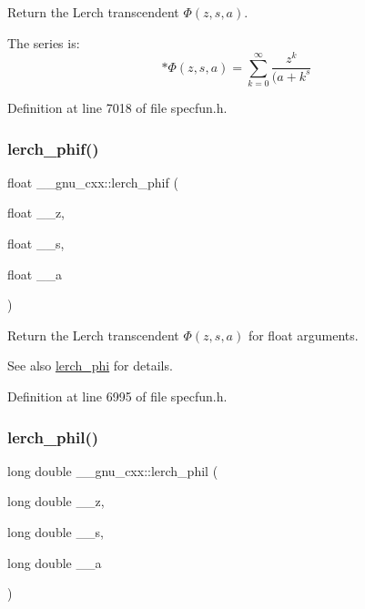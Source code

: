 Return the Lerch transcendent $ \Phi(z,s,a) $.

The series is\+: \[ * \Phi(z,s,a) = \sum_{k=0}^{\infty}\frac{z^k}{(a+k^s} \] 

Definition at line 7018 of file specfun.\+h.

\mbox{\label{group__gnu__math__spec__func_ga90ae3ca570b08b3f458aa83ec2759be3}} 
\subsubsection{\texorpdfstring{lerch\+\_\+phif()}{lerch\_phif()}}
{\footnotesize\ttfamily float \+\_\+\+\_\+gnu\+\_\+cxx\+::lerch\+\_\+phif (\begin{DoxyParamCaption}\item[{float}]{\+\_\+\+\_\+z,  }\item[{float}]{\+\_\+\+\_\+s,  }\item[{float}]{\+\_\+\+\_\+a }\end{DoxyParamCaption})\hspace{0.3cm}{\ttfamily [inline]}}

Return the Lerch transcendent $ \Phi(z,s,a) $ for {\ttfamily float} arguments.

\begin{DoxySeeAlso}{See also}
\hyperlink{group__gnu__math__spec__func_ga31d7cfc601a99d72e58f654d0c890fd6}{lerch\+\_\+phi} for details. 
\end{DoxySeeAlso}


Definition at line 6995 of file specfun.\+h.

\mbox{\label{group__gnu__math__spec__func_gab975fa919ede92ec176330809c16c8d5}} 
\subsubsection{\texorpdfstring{lerch\+\_\+phil()}{lerch\_phil()}}
{\footnotesize\ttfamily long double \+\_\+\+\_\+gnu\+\_\+cxx\+::lerch\+\_\+phil (\begin{DoxyParamCaption}\item[{long double}]{\+\_\+\+\_\+z,  }\item[{long double}]{\+\_\+\+\_\+s,  }\item[{long double}]{\+\_\+\+\_\+a }\end{DoxyParamCaption})\hspace{0.3cm}{\ttfamily [inline]}}

